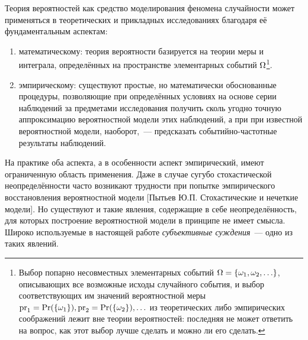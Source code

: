 Теория вероятностей как средство моделирования феномена случайности может применяться в теоретических и прикладных исследованиях благодаря её фундаментальным аспектам:
\begin{enumerate}
  \item математическому: теория вероятности базируется на теории меры и интеграла, определённых на пространстве элементарных событий $\Omega$\footnote{Выбор попарно несовместных элементарных событий $\Omega = \{\omega_1, \omega_2, \ldots\}$, описывающих все возможные исходы случайного события, и выбор соответствующих им значений вероятностной меры ${\mathrm{pr}}_1 = {\mathrm{Pr}}(\{\omega_1\}), {\mathrm{pr}}_2 = {\mathrm{Pr}}(\{\omega_2\}), \ldots$ из теоретических либо эмпирических соображений лежит вне теории вероятностей: последняя не может ответить на вопрос, как этот выбор лучше сделать и можно ли его сделать.}. 
  \item эмпирическому: существуют простые, но математически обоснованные процедуры, позволяющие при определённых условиях
на основе серии наблюдений за предметами исследования получить сколь угодно точную аппроксимацию вероятностной модели этих наблюдений, а при при известной вероятностной модели, наоборот,~--- предсказать событийно-частотные результаты наблюдений. 
\end{enumerate}

На практике оба аспекта, а в особенности аспект эмпирический, имеют ограниченную область применения. 
Даже в случае сугубо стохастической неопределённости часто возникают трудности при попытке эмпирического восстановления вероятностной модели [Пытьев Ю.П. Стохастические и нечеткие модели]. Но существуют и такие явления, содержащие в себе неопределённость, для которых построение вероятностной модели в принципе не имеет смысла. Широко используемые в настоящей работе {\sl субъективные суждения}~--- одно из таких явлений. 
 
